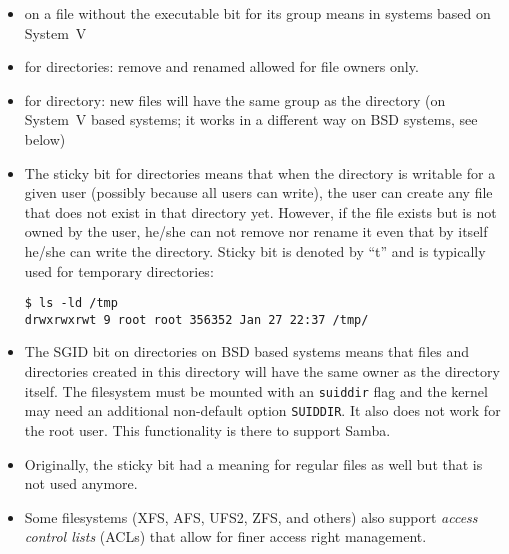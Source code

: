 

\begin{slide}
\begin{center}

\end{center}
\begin{itemize}
\item {} on a file without the executable bit for its group means
 in systems based on System~V
\item {} for directories: remove and renamed allowed for file
owners only.
\item {} for directory: new files will have the same group as the
directory (on System~V based systems; it works in a different way on BSD
systems, see below)
\end{itemize}
\end{slide}

\begin{itemize}
\item The sticky bit for directories means that when the directory is writable
for a given user (possibly because all users can write), the user can create any
file that does not exist in that directory yet.  However, if the file exists but
is not owned by the user, he/she can not remove nor rename it even that by
itself he/she can write the directory.  Sticky bit is denoted by ``t'' and is
typically used for temporary directories:

\begin{verbatim}
$ ls -ld /tmp
drwxrwxrwt 9 root root 356352 Jan 27 22:37 /tmp/
\end{verbatim}

\item The SGID bit on directories on BSD based systems means that files and
directories created in this directory will have the same owner as the directory
itself.  The filesystem must be mounted with an \texttt{suiddir} flag and
the kernel may need an additional non-default option \texttt{SUIDDIR}.  It also
does not work for the root user.  This functionality is there to support Samba.
\item Originally, the sticky bit had a meaning for regular files as well but
that is not used anymore.
\item Some filesystems (XFS, AFS, UFS2, ZFS, and others) also support
\emph{access control lists} (ACLs) that allow for finer access right management.
\end{itemize}

